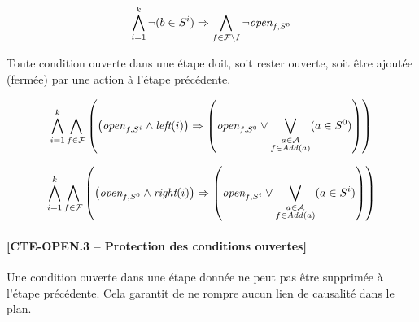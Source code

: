 \begin{small}
\[ \bigwedge\limits_{\substack{i=1}}^{k}\neg (b \in S^{i}) \Rightarrow \bigwedge\limits_{\substack{f\in \mathcal{F}\setminus I}} \neg \textit{open}_{f,S^{0}} \]	
\end{small}

Toute condition ouverte dans une étape doit, soit rester ouverte, soit être ajoutée (fermée) par une action à l'étape précédente.

%

\begin{small}
\[ \bigwedge\limits_{\substack{i=1}}^{k} \bigwedge\limits_{\substack{f\in \mathcal{F}}} \left(\left(\textit{open}_{f,S^{i}} \wedge \textit{left}(i) \right) \Rightarrow \left(\textit{open}_{f,S^{0}} \vee \bigvee\limits_{\substack{a \in \mathcal{A} \\ f \in \mathit{Add}(a)}} (a \in S^{0})\right)\right) \]

\[ \bigwedge\limits_{\substack{i=1}}^{k}\bigwedge\limits_{\substack{f\in \mathcal{F}}}\left(\left(\textit{open}_{f,S^{0}} \wedge \textit{right}(i) \right) \Rightarrow \left(\textit{open}_{f,S^{i}} \vee \bigvee\limits_{\substack{a \in \mathcal{A} \\ f \in \mathit{Add}(a)}} (a \in S^{i})\right)\right)
\]
\end{small}


 \paragraph*{[CTE-OPEN.3 -- Protection des conditions ouvertes]}

Une condition ouverte dans une étape donnée ne peut pas être supprimée à l'étape précédente. Cela garantit de ne rompre aucun lien de causalité dans le plan.

